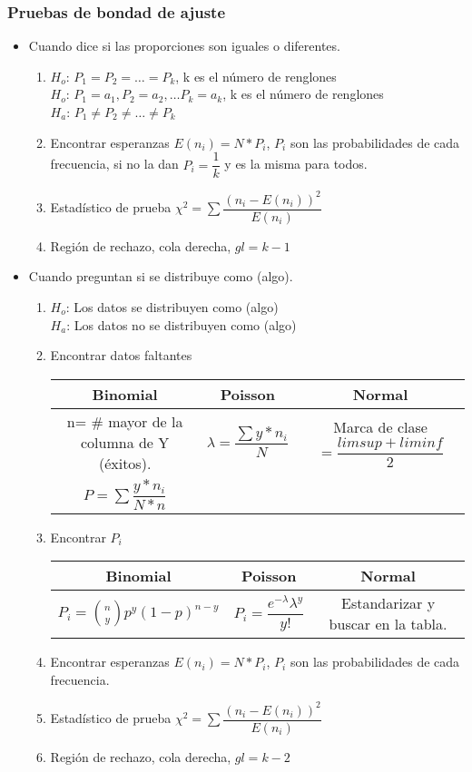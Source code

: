 \subsubsection{Pruebas de bondad de ajuste}
\begin{itemize}
	\item Cuando dice si las proporciones son iguales o diferentes.
	\begin{enumerate}
		\item $H_o$: $P_1=P_2=\dots=P_k$, k es el número de renglones\\
		$H_o$: $P_1=a_1, P_2=a_2,\dots P_k=a_k$, k es el número de renglones\\
		$H_a$:  $P_1\not=P_2\not=\dots\not=P_k$
		\item Encontrar esperanzas $E(n_i)=N*P_i$, $P_i$ son las probabilidades de cada frecuencia, si no la dan $P_i=\dfrac{1}{k}$ y es la misma para todos.
		\item Estadístico de prueba $\chi^2=\sum\dfrac{(n_i-E(n_i))^2}{E(n_i)}$
		\item Región de rechazo, cola derecha, $gl=k-1$
	\end{enumerate}
	\item Cuando preguntan si se distribuye como (algo).
	\begin{enumerate}
		\item $H_o$: Los datos se distribuyen como (algo)\\
		$H_a$:  Los datos no se distribuyen como (algo)
		\item Encontrar datos faltantes
		
		\begin{tabular}{|c|c|c|}
			\hline
			Binomial & Poisson & Normal\\
			\hline
			n= $\#$ mayor de la columna de Y (éxitos). & $\lambda=\dfrac{\sum y*n_i}{N}$ & Marca de clase $=\dfrac{lim sup+lim inf}{2}$\\
			$P=\sum \dfrac{y*n_i}{N*n}$ & & \\
			\hline
		\end{tabular}
		\item Encontrar $P_i$
		
		\begin{tabular}{|c|c|c|}
			\hline
			Binomial & Poisson & Normal\\
			\hline
			$P_i= \binom{n}{y}p^y(1-p)^{n-y}$ & $P_i=\dfrac{e^{-\lambda}\lambda^y}{y!}$ & Estandarizar y buscar en la tabla.\\
			\hline
		\end{tabular}
		\item Encontrar esperanzas $E(n_i)=N*P_i$, $P_i$ son las probabilidades de cada frecuencia.
		\item Estadístico de prueba $\chi^2=\sum\dfrac{(n_i-E(n_i))^2}{E(n_i)}$
		\item Región de rechazo, cola derecha, $gl=k-2$
	\end{enumerate}
\end{itemize}

